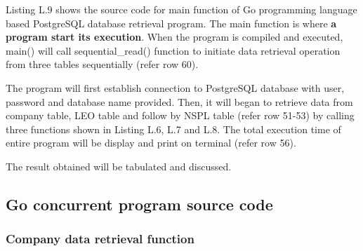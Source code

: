 Listing L.9 shows the source code for main function of Go programming language based PostgreSQL database retrieval program. The main function is where \textbf{a program start its execution}. When the program is compiled and executed, main() will call sequential\_read() function to initiate data retrieval operation from three tables sequentially (refer row 60). 

The program will first establish connection to PostgreSQL database with user, password and database name provided. Then, it will began to retrieve data from company table, LEO table and follow by NSPL table (refer row 51-53) by calling three functions shown in Listing L.6, L.7 and L.8. The total execution time of entire program will be display and print on terminal (refer row 56). 

The result obtained will be tabulated and discussed. 

\newpage 

\subsection{Go concurrent program source code}

\subsubsection{Company data retrieval function}

